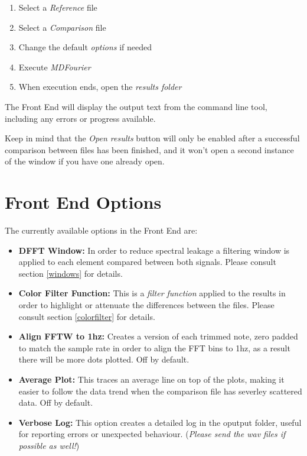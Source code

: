 \documentclass[10pt,a4paper]{report}
\begin{document}
\begin{enumerate}
	\item Select a \textit{Reference} file
	\item Select a \textit{Comparison} file
	\item Change the default \textit{options} if needed
	\item Execute \textit{MDFourier}
	\item When execution ends, open the \textit{results folder}
\end{enumerate}

The Front End will display the output text from the command line tool, including any errors or progress available.

Keep in mind that the \textit{Open results} button will only be enabled after a successful comparison between files has been finished, and it won't open a second instance of the window if you have one already open.

\section{Front End Options}

The currently available options in the Front End are:

\begin{itemize}
	\item \textbf{DFFT Window:} In order to reduce spectral leakage a filtering window is applied to each element compared between both signals. Please consult section \ref{windows} for details. 
	\item \textbf{Color Filter Function:} This is a \textit{filter function} applied to the results in order to highlight or attenuate the differences between the files.  Please consult section \ref{colorfilter} for details. 
	\item \textbf{Align FFTW to 1hz:} Creates a version of each trimmed note, zero padded to match the sample rate in order to align the FFT bins to 1hz, as a  result there will be more dots plotted. Off by default.
	\item \textbf{Average Plot:} This traces an average line on top of the plots, making it easier to follow the data trend when the comparison file has severley scattered data. Off by default.
	\item \textbf{Verbose Log:} This option creates a detailed log in the oputput folder, useful for reporting errors or unexpected behaviour. (\textit{Please send the wav files if possible as well!})
\end{itemize}
\end{document}
